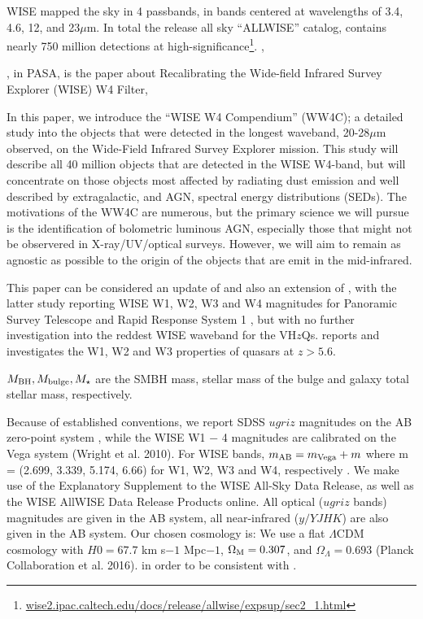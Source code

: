 \documentclass[usenatbib]{mnras}
\begin{document}
WISE mapped the sky in 4 passbands, in bands centered at wavelengths
of 3.4, 4.6, 12, and 23$\mu$m.  In total the release all sky
``ALLWISE'' catalog, contains nearly 750 million detections at
high-significance\footnote{\href{http://wise2.ipac.caltech.edu/docs/release/allwise/expsup/sec2\_1.html}{wise2.ipac.caltech.edu/docs/release/allwise/expsup/sec2\_1.html}}.
\citet{Assef2013}, \citet{Stern2012}

\citet{Brown2014b}, in PASA, is the paper about Recalibrating the Wide-field Infrared Survey Explorer (WISE) W4 Filter,

In this paper, we introduce the ``WISE W4 Compendium'' (WW4C); a
detailed study into the objects that were detected in the longest
waveband, 20-28$\mu$m observed, on the Wide-Field Infrared Survey
Explorer \citep[WISE;][]{Wright2010, Cutri2013} mission.
This study will describe all 40 million objects that are detected in
the WISE W4-band, but will concentrate on those objects most affected
by radiating dust emission and well described by extragalactic, and
AGN, spectral energy distributions (SEDs).  The motivations of the
WW4C are numerous, but the primary science we will pursue is the
identification of bolometric luminous AGN, especially those that might
not be observered in X-ray/UV/optical surveys.
However, we will aim to remain as agnostic as possible to the origin
of the objects that are emit in the mid-infrared.

This paper can be considered an update of \citet{Blain2013} and also
an extension of \citet{Banados2014}, with the latter study reporting
WISE W1, W2, W3 and W4 magnitudes for Panoramic Survey Telescope and Rapid Response System 1 
\citep[Pan-STARRS1, PS1;][]{Kaiser2002, Kaiser2010}, but with no  
further investigation into the reddest WISE waveband for the VH$z$Qs.
\citet{Banados2016} reports and investigates the W1, W2 and W3 properties
of quasars at $z > 5.6$.

$M_{\rm BH}, M_{\rm bulge}, M_{\star}$ are the SMBH mass, stellar mass of the bulge and 
 galaxy total stellar mass, respectively. 

Because of established conventions, we report SDSS $ugriz$ magnitudes on
the AB zero-point system \citep{Oke_Gunn1983, Fukugita1996}, 
while the WISE W1 − 4 magnitudes are calibrated on the Vega system
(Wright et al. 2010). For WISE bands, $m_{\rm AB} = m_{\rm Vega} + m$ where m =
(2.699, 3.339, 5.174, 6.66) for W1, W2, W3 and W4, respectively
\citep{Cutri2011, Brown2014b}. We make use of the Explanatory Supplement to the
WISE All-Sky Data Release, as well as the WISE AllWISE Data Release
Products online.
All optical ($ugriz$ bands) magnitudes are given in the AB system, all near-infrared 
($y/YJHK$) are also given in the AB system. 
Our chosen cosmology is: 
We use a flat $\Lambda$CDM cosmology with $H0 = 67.7$ km s$-1$ Mpc$−1$, 
$\Omega_{\rm M} = 0.307$, and $\Omega_{\Lambda} = 0.693$ (Planck Collaboration et al. 2016).
in order to be consistent with \citet{Banados2016}. 
\end{document}
